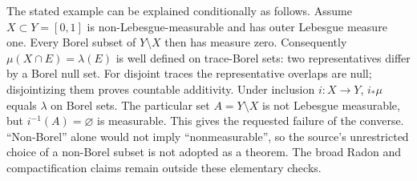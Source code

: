 \documentclass[11pt]{article}
\begin{document}
The stated example can be explained conditionally as follows. Assume $X\subset Y=[0,1]$ is non-Lebesgue-measurable and has outer Lebesgue measure one. Every Borel subset of $Y\setminus X$ then has measure zero. Consequently $\mu(X\cap E)=\lambda(E)$ is well defined on trace-Borel sets: two representatives differ by a Borel null set. For disjoint traces the representative overlaps are null; disjointizing them proves countable additivity. Under inclusion $i:X\to Y$, $i_*\mu$ equals $\lambda$ on Borel sets. The particular set $A=Y\setminus X$ is not Lebesgue measurable, but $i^{-1}(A)=\varnothing$ is measurable. This gives the requested failure of the converse. “Non-Borel” alone would not imply “nonmeasurable”, so the source's unrestricted choice of a non-Borel subset is not adopted as a theorem. The broad Radon and compactification claims remain outside these elementary checks.
\end{document}
